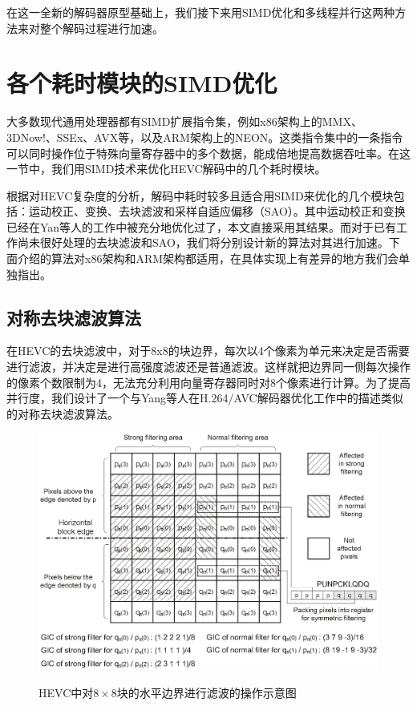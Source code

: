 在这一全新的解码器原型基础上，我们接下来用SIMD优化和多线程并行这两种方法来对整个解码过程进行加速。

\section{各个耗时模块的SIMD优化}

大多数现代通用处理器都有SIMD扩展指令集，例如x86架构上的MMX、3DNow!、SSEx、AVX等\supercite{Intel-manual}，以及ARM架构上的NEON\supercite{ARM-manual}。这类指令集中的一条指令可以同时操作位于特殊向量寄存器中的多个数据，能成倍地提高数据吞吐率。在这一节中，我们用SIMD技术来优化HEVC解码中的几个耗时模块。

根据对HEVC复杂度的分析\supercite{Bossen-TCSVT2012,Yan-VCIP2012}，解码中耗时较多且适合用SIMD来优化的几个模块包括：运动校正、变换、去块滤波和采样自适应偏移（SAO）。其中运动校正和变换已经在Yan等人的工作\supercite{Yan-VCIP2012}中被充分地优化过了，本文直接采用其结果。而对于已有工作尚未很好处理的去块滤波和SAO，我们将分别设计新的算法对其进行加速。下面介绍的算法对x86架构和ARM架构都适用，在具体实现上有差异的地方我们会单独指出。

\subsection{对称去块滤波算法}

在HEVC的去块滤波中，对于8x8的块边界，每次以4个像素为单元来决定是否需要进行滤波，并决定是进行高强度滤波还是普通滤波。这样就把边界同一侧每次操作的像素个数限制为4，无法充分利用向量寄存器同时对8个像素进行计算。为了提高并行度，我们设计了一个与Yang等人在H.264/AVC解码器优化工作\supercite{Yang-TCE2006}中的描述类似的对称去块滤波算法。

\begin{figure}[h]
	\centering
	\includegraphics[width = 1.0\linewidth]{eps/vertical_DF_to_horizontal_edge}\\
	\caption{\label{fig:vertical_DF_to_horizontal_edge}HEVC中对$8 \times 8$块的水平边界进行滤波的操作示意图}
\end{figure}

